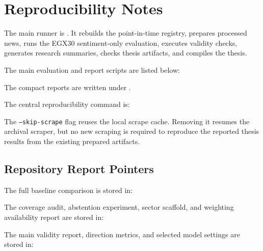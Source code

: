 \chapter{Reproducibility Notes}

The main runner is . It rebuilds the point-in-time registry, prepares processed news, runs the EGX30 sentiment-only evaluation, executes validity checks, generates research summaries, checks thesis artifacts, and compiles the thesis.

The main evaluation and report scripts are listed below:

\begin{pathblock}
\end{pathblock}

The compact reports are written under .

The central reproducibility command is:
\begin{pathblock}
\end{pathblock}

The \texttt{--skip-scrape} flag reuses the local scrape cache. Removing it resumes the archival scraper, but no new scraping is required to reproduce the reported thesis results from the existing prepared artifacts.

\section*{Repository Report Pointers}

The full baseline comparison is stored in:
\begin{pathblock}
\end{pathblock}

The coverage audit, abstention experiment, sector scaffold, and weighting availability report are stored in:
\begin{pathblock}
\end{pathblock}

The main validity report, direction metrics, and selected model settings are stored in:
\begin{pathblock}
\end{pathblock}
